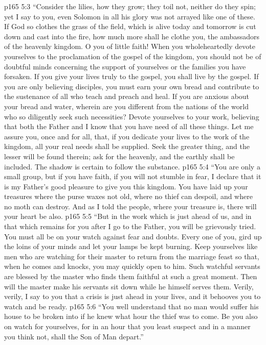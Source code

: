 \vs p165 5:3 \textcolor{ubdarkred}{“Consider the lilies, how they grow; they toil not, neither do they spin; yet I say to you, even Solomon in all his glory was not arrayed like one of these. If God so clothes the grass of the field, which is alive today and tomorrow is cut down and cast into the fire, how much more shall he clothe you, the ambassadors of the heavenly kingdom. O you of little faith! When you wholeheartedly devote yourselves to the proclamation of the gospel of the kingdom, you should not be of doubtful minds concerning the support of yourselves or the families you have forsaken. If you give your lives truly to the gospel, you shall live by the gospel. If you are only believing disciples, you must earn your own bread and contribute to the sustenance of all who teach and preach and heal. If you are anxious about your bread and water, wherein are you different from the nations of the world who so diligently seek such necessities? Devote yourselves to your work, believing that both the Father and I know that you have need of all these things. Let me assure you, once and for all, that, if you dedicate your lives to the work of the kingdom, all your real needs shall be supplied. Seek the greater thing, and the lesser will be found therein; ask for the heavenly, and the earthly shall be included. The shadow is certain to follow the substance.}
\vs p165 5:4 \textcolor{ubdarkred}{“You are only a small group, but if you have faith, if you will not stumble in fear, I declare that it is my Father’s good pleasure to give you this kingdom. You have laid up your treasures where the purse waxes not old, where no thief can despoil, and where no moth can destroy. And as I told the people, where your treasure is, there will your heart be also.}
\vs p165 5:5 \textcolor{ubdarkred}{“But in the work which is just ahead of us, and in that which remains for you after I go to the Father, you will be grievously tried. You must all be on your watch against fear and doubts. Every one of you, gird up the loins of your minds and let your lamps be kept burning. Keep yourselves like men who are watching for their master to return from the marriage feast so that, when he comes and knocks, you may quickly open to him. Such watchful servants are blessed by the master who finds them faithful at such a great moment. Then will the master make his servants sit down while he himself serves them. Verily, verily, I say to you that a crisis is just ahead in your lives, and it behooves you to watch and be ready.}
\vs p165 5:6 \textcolor{ubdarkred}{“You well understand that no man would suffer his house to be broken into if he knew what hour the thief was to come. Be you also on watch for yourselves, for in an hour that you least suspect and in a manner you think not, shall the Son of Man depart.”}
